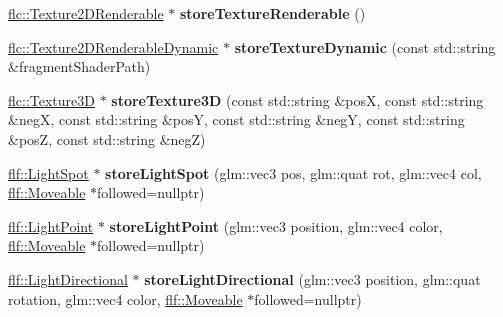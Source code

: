 \begin{DoxyCompactItemize}
\item 
\hyperlink{classflw_1_1flc_1_1Texture2DRenderable}{flc\+::\+Texture2\+D\+Renderable} $\ast$ {\bfseries store\+Texture\+Renderable} ()\hypertarget{classflw_1_1Engine_aa99a2c0cd6a324729645ff39a6a3fbc2}{}\label{classflw_1_1Engine_aa99a2c0cd6a324729645ff39a6a3fbc2}

\item 
\hyperlink{classflw_1_1flc_1_1Texture2DRenderableDynamic}{flc\+::\+Texture2\+D\+Renderable\+Dynamic} $\ast$ {\bfseries store\+Texture\+Dynamic} (const std\+::string \&fragment\+Shader\+Path)\hypertarget{classflw_1_1Engine_a972d208b867f3e8dc2e22ea785049c70}{}\label{classflw_1_1Engine_a972d208b867f3e8dc2e22ea785049c70}

\item 
\hyperlink{classflw_1_1flc_1_1Texture3D}{flc\+::\+Texture3D} $\ast$ {\bfseries store\+Texture3D} (const std\+::string \&posX, const std\+::string \&negX, const std\+::string \&posY, const std\+::string \&negY, const std\+::string \&posZ, const std\+::string \&negZ)\hypertarget{classflw_1_1Engine_a92182f6d9157ff16568f224b431138cc}{}\label{classflw_1_1Engine_a92182f6d9157ff16568f224b431138cc}

\item 
\hyperlink{classflw_1_1flf_1_1LightSpot}{flf\+::\+Light\+Spot} $\ast$ {\bfseries store\+Light\+Spot} (glm\+::vec3 pos, glm\+::quat rot, glm\+::vec4 col, \hyperlink{classflw_1_1flf_1_1Moveable}{flf\+::\+Moveable} $\ast$followed=nullptr)\hypertarget{classflw_1_1Engine_a0aeefd08b5cfc40ed9a5a82a91693cc6}{}\label{classflw_1_1Engine_a0aeefd08b5cfc40ed9a5a82a91693cc6}

\item 
\hyperlink{classflw_1_1flf_1_1LightPoint}{flf\+::\+Light\+Point} $\ast$ {\bfseries store\+Light\+Point} (glm\+::vec3 position, glm\+::vec4 color, \hyperlink{classflw_1_1flf_1_1Moveable}{flf\+::\+Moveable} $\ast$followed=nullptr)\hypertarget{classflw_1_1Engine_abd668a07a20b7241aaca67f49d0cf9f1}{}\label{classflw_1_1Engine_abd668a07a20b7241aaca67f49d0cf9f1}

\item 
\hyperlink{classflw_1_1flf_1_1LightDirectional}{flf\+::\+Light\+Directional} $\ast$ {\bfseries store\+Light\+Directional} (glm\+::vec3 position, glm\+::quat rotation, glm\+::vec4 color, \hyperlink{classflw_1_1flf_1_1Moveable}{flf\+::\+Moveable} $\ast$followed=nullptr)\hypertarget{classflw_1_1Engine_a017f4a374d3acaac4120afeb2594ec4d}{}\label{classflw_1_1Engine_a017f4a374d3acaac4120afeb2594ec4d}


\end{DoxyCompactItemize}
